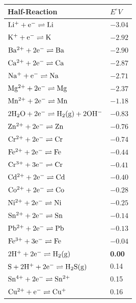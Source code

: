 \begin{table}
\begin{center}
\begin{tabular}{|l|l|}\hline 
\textbf{Half-Reaction}
&
\textbf{$E^{\circ}V$} \\ \hline\hline
$\rm{Li^{+} + e^{-} \rightleftharpoons Li}$ & $-3.04$ \\ \hline
$\rm{K^{+} + e^{-} \rightleftharpoons K }$& $-2.92$ \\ \hline
$\rm{Ba^{2+} + 2e^{-} \rightleftharpoons Ba} $& $-2.90$ \\ \hline
$\rm{Ca^{2+} + 2e^{-} \rightleftharpoons Ca} $& $-2.87$ \\ \hline
$\rm{Na^{+} + e^{-} \rightleftharpoons Na }$& $-2.71$ \\ \hline
$\rm{Mg^{2+} + 2e^{-} \rightleftharpoons Mg }$& $-2.37$ \\ \hline
$\rm{Mn^{2+} + 2e^{-} \rightleftharpoons Mn }$& $-1.18$ \\ \hline
$\rm{2H_{2}O + 2e^{-} \rightleftharpoons H_{2} (g) + 2 OH^{-} }$& $-0.83$ \\ \hline
$\rm{Zn^{2+} + 2e^{-} \rightleftharpoons Zn }$& $-0.76$ \\ \hline
$\rm{Cr^{2+} + 2e^{-} \rightleftharpoons Cr }$& $-0.74$ \\ \hline
$\rm{Fe^{2+} + 2e^{-} \rightleftharpoons Fe }$& $-0.44$ \\ \hline
$\rm{Cr^{3+} + 3e^{-} \rightleftharpoons Cr }$& $-0.41$ \\ \hline
$\rm{Cd^{2+} + 2e^{-} \rightleftharpoons Cd }$& $-0.40$\\ \hline
$\rm{Co^{2+} + 2e^{-} \rightleftharpoons Co }$& $-0.28$ \\ \hline
$\rm{Ni^{2+} + 2e^{-} \rightleftharpoons Ni }$& $-0.25$ \\ \hline
$\rm{Sn^{2+} + 2e^{-} \rightleftharpoons Sn }$& $-0.14$ \\ \hline
$\rm{Pb^{2+} + 2e^{-} \rightleftharpoons Pb }$& $-0.13$ \\ \hline
$\rm{Fe^{3+} + 3e^{-} \rightleftharpoons Fe }$& $-0.04$ \\ \hline
$\rm{2H^{+} + 2e^{-} \rightleftharpoons H_{2} (g) }$& \textbf{0.00} \\ \hline
$\rm{S + 2H^{+} + 2e^{-} \rightleftharpoons H_{2}S (g) }$& 0.14 \\ \hline
$\rm{Sn^{4+} + 2e^{-} \rightleftharpoons Sn^{2+} }$& 0.15 \\ \hline
$\rm{Cu^{2+} + e^{-} \rightleftharpoons Cu^{+} }$& 0.16 \\ \hline

\end{tabular}
\end{center}
\end{table}
